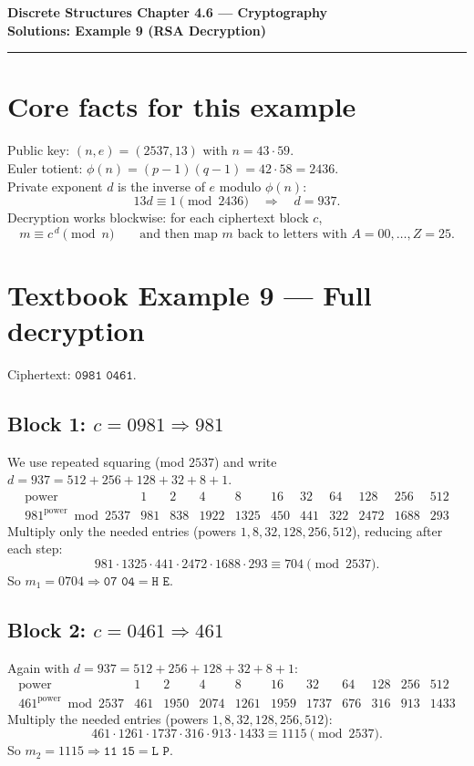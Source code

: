 \documentclass[12pt]{article}
\begin{document}
{\large \textbf{Discrete Structures \qquad Chapter 4.6 — Cryptography}}\\
\textbf{Solutions: Example 9 (RSA Decryption)}

\hrule
\vspace{0.6em}

\section*{Core facts for this example}
Public key: \((n,e)=(2537,13)\) with \(n=43\cdot59\).\\
Euler totient: \(\phi(n)=(p-1)(q-1)=42\cdot58=2436\).\\
Private exponent \(d\) is the inverse of \(e\) modulo \(\phi(n)\):
\[
13d\equiv 1\pmod{2436}\quad\Rightarrow\quad d=937.
\]
Decryption works blockwise: for each ciphertext block \(c\),
\[
m \equiv c^{\,d}\pmod{n} \qquad\text{and then map } m\text{ back to letters with }A=00,\dots,Z=25.
\]

\section*{Textbook Example 9 — Full decryption}
Ciphertext: \(\texttt{0981 0461}\).

\subsection*{Block 1: \(c=0981\Rightarrow 981\)}
We use repeated squaring (mod \(2537\)) and write \(d=937=512+256+128+32+8+1\).
\[
\begin{array}{r|rrrrrrrrr}
\text{power} & 1 & 2 & 4 & 8 & 16 & 32 & 64 & 128 & 256 & 512\\\hline
981^{\text{power}} \bmod 2537 &
981 & 838 & 1922 & 1325 & 450 & 441 & 322 & 2472 & 1688 & 293
\end{array}
\]
Multiply only the needed entries (powers \(1,8,32,128,256,512\)), reducing after each step:
\[
981\cdot1325\cdot441\cdot2472\cdot1688\cdot293 \equiv \boxed{704}\pmod{2537}.
\]
So \(m_1=0704\Rightarrow \texttt{07 04}=\texttt{H E}\).

\subsection*{Block 2: \(c=0461\Rightarrow 461\)}
Again with \(d=937=512+256+128+32+8+1\):
\[
\begin{array}{r|rrrrrrrrr}
\text{power} & 1 & 2 & 4 & 8 & 16 & 32 & 64 & 128 & 256 & 512\\\hline
461^{\text{power}} \bmod 2537 &
461 & 1950 & 2074 & 1261 & 1959 & 1737 & 676 & 316 & 913 & 1433
\end{array}
\]
Multiply the needed entries (powers \(1,8,32,128,256,512\)):
\[
461\cdot1261\cdot1737\cdot316\cdot913\cdot1433 \equiv \boxed{1115}\pmod{2537}.
\]
So \(m_2=1115\Rightarrow \texttt{11 15}=\texttt{L P}\).
\end{document}
